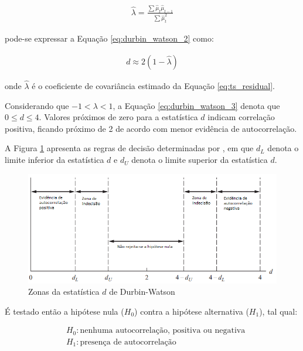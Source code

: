 \begin{ceqn}
\begin{align} \label{eq:dw_lambda}
\hat{\lambda} = \frac{\sum{\hat{\mu}_{t} \hat{\mu}_{t-1}}}{\sum{\hat{\mu}_{t}^2}}
\end{align}
\end{ceqn} pode-se expressar a Equação \eqref{eq:durbin_watson_2} como:

\begin{ceqn}
\begin{align} \label{eq:durbin_watson_3}
d \approx 2 (1 - \hat{\lambda})
\end{align}
\end{ceqn} onde $\hat{\lambda}$ é o coeficiente de covariância estimado da Equação \eqref{eq:ts_residual}.

Considerando que $-1 < \lambda < 1$, a Equação \eqref{eq:durbin_watson_3} denota que $0 \leq d \leq 4$. Valores próximos de zero para a estatística $d$ indicam correlação positiva, ficando próximo de 2 de acordo com menor evidência de autocorrelação. 

A Figura \ref{figure:intervalos_dw} apresenta as regras de decisão determinadas por , em que $d_{L}$ denota o limite inferior da estatística $d$ e $d_{U}$ denota o limite superior da estatística $d$.

\begin{figure}[hbtp]
	\centering
	\caption{Zonas da estatística $d$ de Durbin-Watson} \label{figure:intervalos_dw}
	\includegraphics[scale = 0.65]{figuras/figura_durbin_watson.PNG}
\end{figure}

É testado então a hipótese nula ($H_{0}$) contra a hipótese alternativa ($H_{1}$), tal qual:

\begin{ceqn}
\begin{align} \label{eq:hipoteses_autocorrelacao}
&H_{0}: \text{nenhuma autocorrelação, positiva ou negativa} \\
&H_{1}: \text{presença de autocorrelação}
\end{align}
\end{ceqn}

